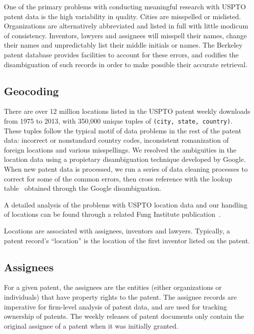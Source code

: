 One of the primary problems with conducting meaningful research with
USPTO patent data is the high variability in quality. Cities are misspelled
or mislisted. Organizations are alternatively abbreviated and listed
in full with little modicum of consistency. Inventors, lawyers and
assignees will misspell their names, change their names and unpredictably
list their middle initials or names. The Berkeley patent database
provides facilities to account for these errors, and codifies the
disambiguation of such records in order to make possible their accurate
retrieval.


\subsection{Geocoding}

There are over 12 million locations listed in the USPTO patent weekly
downloads from 1975 to 2013, with 350,000 unique tuples of \verb`(city, state, country)`.
These tuples follow the typical motif of data problems in the rest
of the patent data: incorrect or nonstandard country codes, inconsistent
romanization of foreign locations and various misspellings. We resolved
the ambiguities in the location data using a propietary disambiguation
technique developed by Google. When new patent data is processed,
we run a series of data cleaning processes to correct for some of
the common errors, then cross reference with the lookup table~\cite{geotable}
obtained through the Google disambiguation.

A detailed analysis of the problems with USPTO location data and our
handling of locations can be found through a related Fung Institute
publication~\cite{geocoding}.

Locations are associated with assignees, inventors and lawyers. Typically,
a patent record's ``location'' is the location of the first inventor
listed on the patent.


\subsection{Assignees}

For a given patent, the assignees are the entities (either organizations
or individuals) that have property rights to the patent. The assignee
records are imperative for firm-level analysis of patent data, and
are used for tracking ownership of patents. The weekly releases of
patent documents only contain the original assignee of a patent when
it was initially granted.


